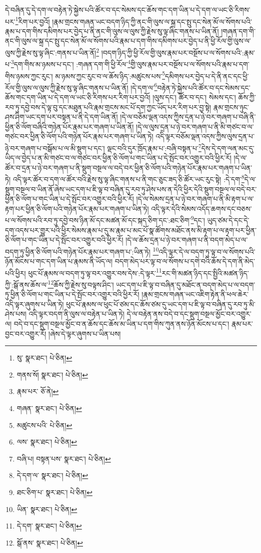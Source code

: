 དེ་བཞིན་དུ་དེ་དག་ལ་བརྟེན་ཏེ་སྐྱེས་པའི་ཚོར་བ་དང་སེམས་དང་ཆོས་གང་དག་ཡིན་པ་དེ་དག་ལ་ཡང་ཅི་རིགས་པར་\footnote{སུ་  སྣར་ཐང་།  པེ་ཅིན། }རིག་པར་བྱའོ། །རྣམ་གྲངས་གཞན་ཡང་བདག་ཉིད་ཀྱི་ནང་གི་ལུས་ལ་སྐྲ་དང་སྤུ་དང་སེན་མོ་ལ་སོགས་པའི་རྣམ་པ་དག་གིས་དམིགས་པར་བྱེད་པ་ནི་ནང་གི་ལུས་ལ་ལུས་ཀྱི་རྗེས་སུ་ལྟ་ཞིང་གནས་པ་ཡིན་ནོ། །གཞན་དག་གི་ནང་གི་ལུས་ལ་སྐྲ་དང་སྤུ་དང་སེན་མོ་ལ་སོགས་པའི་རྣམ་པ་དག་གིས་དམིགས་པར་བྱེད་པ་ནི་ཕྱི་རོལ་གྱི་ལུས་ལ་ལུས་ཀྱི་རྗེས་སུ་ལྟ་ཞིང་:གནས་པ་ཡིན་ནོ།\footnote{གནས་སོ།  སྣར་ཐང་།  པེ་ཅིན། } །བདག་ཉིད་ཀྱི་ཕྱི་རོལ་གྱི་ལུས་རྣམ་པར་བསྔོས་པ་ལ་སོགས་པའི་:རྣམ་པ་\footnote{རྣམ་པར་  ཅོ་ནེ། }དག་གིས་མ་ཉམས་པ་དང་། :གཞན་དག་གི་ཕྱི་རོལ་\footnote{གཞན་  སྣར་ཐང་།  པེ་ཅིན། }གྱི་ལུས་རྣམ་པར་བསྔོས་པ་ལ་སོགས་པའི་རྣམ་པ་དག་གིས་ཉམས་ཀྱང་རུང་། མ་ཉམས་ཀྱང་རུང་བ་ལ་ཆོས་ཉིད་:མཚུངས་པས་\footnote{མཚུངས་པའི་  པེ་ཅིན། }དམིགས་པར་བྱེད་པ་དེ་ནི་ནང་དང་ཕྱི་རོལ་གྱི་ལུས་ལ་ལུས་ཀྱི་རྗེས་སུ་ལྟ་ཞིང་གནས་པ་ཡིན་ནོ། །དེ་དག་ལ་\footnote{ལས་  སྣར་ཐང་།  པེ་ཅིན། }བརྟེན་ཏེ་སྐྱེས་པའི་ཚོར་བ་དང་སེམས་དང་ཆོས་གང་དག་ཡིན་པ་དེ་དག་ལ་ཡང་ཅི་རིགས་པར་རིག་པར་བྱའོ། །ལུས་དང་། ཚོར་བ་དང་། སེམས་དང་། ཆོས་ཀྱི་རབ་ཏུ་དབྱེ་བས་དེ་ལྟ་བུ་དང་མཐུན་པའི་རྣམ་གྲངས་མང་པོ་དག་ཀྱང་ཡོད་པར་རིག་པར་བྱ་སྟེ། རྣམ་གྲངས་ཉུང་ཤས་ཤིག་ཡང་དག་པར་བསྟན་པ་ནི་དེ་དག་ཡིན་ནོ། །དེ་ལ་བཅོམ་ལྡན་འདས་ཀྱིས་དྲན་པ་ཉེ་བར་གཞག་པ་བཞི་ནི་ཕྱིན་ཅི་ལོག་བཞིའི་གཉེན་པོར་རྣམ་པར་གཞག་པ་ཡིན་ནོ། །དེ་ལ་ལུས་དྲན་པ་ཉེ་བར་གཞག་པ་ནི་མི་གཙང་བ་ལ་གཙང་བར་ཕྱིན་ཅི་ལོག་པའི་གཉེན་པོར་རྣམ་པར་གཞག་པ་ཡིན་ཏེ། འདི་ལྟར་བཅོམ་ལྡན་འདས་ཀྱིས་ལུས་དྲན་པ་ཉེ་བར་གཞག་པ་བསྒོམ་པ་ལ་མི་སྡུག་པ་དང་། ལྡང་བའི་དུར་ཁྲོད་རྣམ་པ་:བཞི་བསྟན་པ་\footnote{བཞི་པ། བསྟན་པས་  སྣར་ཐང་།  པེ་ཅིན། }དེས་དེ་དག་ལན་མང་དུ་ཡིད་ལ་བྱེད་པ་ན་མི་གཙང་བ་ལ་གཙང་བར་ཕྱིན་ཅི་ལོག་པ་གང་ཡིན་པ་དེ་སྤོང་བར་འགྱུར་བའི་ཕྱིར་རོ། །དེ་ལ་ཚོར་བ་དྲན་པ་ཉེ་བར་གཞག་པ་ནི་སྡུག་བསྔལ་ལ་བདེ་བར་ཕྱིན་ཅི་ལོག་པའི་གཉེན་པོར་རྣམ་པར་གཞག་པ་ཡིན་ཏེ། འདི་ལྟར་ཚོར་བ་དག་ལ་ཚོར་བའི་རྗེས་སུ་ལྟ་ཞིང་གནས་པ་ནི་གང་ཅུང་ཟད་ཅི་ཚོར་ཡང་རུང་སྟེ། :དེ་དག་\footnote{དེ་དག་ལ་  སྣར་ཐང་།  པེ་ཅིན། }དེ་ལ་སྡུག་བསྔལ་བ་ཡིན་ནོ་ཞེས་ཡང་དག་པ་ཇི་ལྟ་བ་བཞིན་དུ་རབ་ཏུ་ཤེས་པས་ན་དེའི་ཕྱིར་དེའི་སྡུག་བསྔལ་ལ་བདེ་བར་ཕྱིན་ཅི་ལོག་པ་གང་ཡིན་པ་དེ་སྤོང་བར་འགྱུར་བའི་ཕྱིར་རོ། །དེ་ལ་སེམས་དྲན་པ་ཉེ་བར་གཞག་པ་ནི་མི་རྟག་པ་ལ་རྟག་པར་ཕྱིན་ཅི་ལོག་པའི་གཉེན་པོར་རྣམ་པར་གཞག་པ་ཡིན་ཏེ། འདི་ལྟར་དེའི་སེམས་འདོད་ཆགས་དང་བཅས་པ་ལ་སོགས་པའི་རབ་ཏུ་དབྱེ་བས་ཉིན་མོ་དང་མཚན་མོ་དང་སྐད་ཅིག་དང་:ཐང་ཅིག་\footnote{ཐང་ཅིག་པ་  སྣར་ཐང་།  པེ་ཅིན། }དང་། ཡུད་ཙམ་དེ་དང་དེ་དག་འདས་པར་གྱུར་པའི་ཕྱིར་སེམས་རྣམ་པ་དུ་མ་རྣམ་པ་མང་པོ་སྣ་ཚོགས་མཐོང་ནས་མི་རྟག་པ་ལ་རྟག་པར་ཕྱིན་ཅི་ལོག་པ་གང་ཡིན་པ་དེ་སྤོང་བར་འགྱུར་བའི་ཕྱིར་རོ། །དེ་ལ་ཆོས་དྲན་པ་ཉེ་བར་གཞག་པ་ནི་བདག་མེད་པ་ལ་བདག་ཏུ་ཕྱིན་ཅི་ལོག་པའི་གཉེན་པོར་རྣམ་པར་གཞག་པ་:ཡིན་ཏེ། \footnote{ཡིན་  སྣར་ཐང་།  པེ་ཅིན། }འདི་ལྟར་དེ་ལ་བདག་ཏུ་ལྟ་བ་ལ་སོགས་པའི་ཉོན་མོངས་པ་གང་དག་ཡིན་པ་རྣམས་ནི་ཡོད་ལ། བདག་མེད་པར་ལྟ་བ་ལ་སོགས་པ་དགེ་བའི་ཆོས་དེ་དག་ནི་མེད་པའི་ཕྱིར། ཕུང་པོ་རྣམས་ལ་བདག་ཏུ་ལྟ་བར་འགྱུར་བས་དེས་:དེ་ལྟར་\footnote{དེ་དག་  སྣར་ཐང་།  པེ་ཅིན། }རང་གི་མཚན་ཉིད་དང་སྤྱིའི་མཚན་ཉིད་ཀྱི་:སྒོ་ནས་ཆོས་ལ་\footnote{སྒོ་ནས་  སྣར་ཐང་།  པེ་ཅིན། }ཆོས་ཀྱི་རྗེས་སུ་བལྟས་ཤིང་། ཡང་དག་པ་ཇི་ལྟ་བ་བཞིན་དུ་མཐོང་ན་བདག་མེད་པ་ལ་བདག་ཏུ་ཕྱིན་ཅི་ལོག་པ་གང་ཡིན་པ་དེ་སྤོང་བར་འགྱུར་བའི་ཕྱིར་རོ། །རྣམ་གྲངས་གཞན་ཡང་འཇིག་རྟེན་ནི་ཕལ་ཆེར་འདི་ལྟར་ཞུགས་པ་ཡིན་ཏེ། ཕུང་པོ་རྣམས་ལ་ཕུང་པོ་ཙམ་དང་ཆོས་ཙམ་དུ་ཡང་དག་པ་ཇི་ལྟ་བ་བཞིན་དུ་རབ་ཏུ་མི་ཤེས་པས། འདི་ལྟར་བདག་ནི་ལུས་ལ་བརྟེན་པ་ཡིན་ཏེ། དེ་ལ་བརྟེན་ནས་བདེ་བ་དང་སྡུག་བསྔལ་མྱོང་བར་འགྱུར་ལ། བདེ་བ་དང་སྡུག་བསྔལ་མྱོང་བ་ན་ཆོས་དང་ཆོས་མ་ཡིན་པ་དག་གིས་ཀུན་ནས་ཉོན་མོངས་པ་དང་། རྣམ་པར་བྱང་བར་འགྱུར་རོ། །ཞེས་དེ་ལྟར་ཞུགས་པ་ཡིན་པས། 